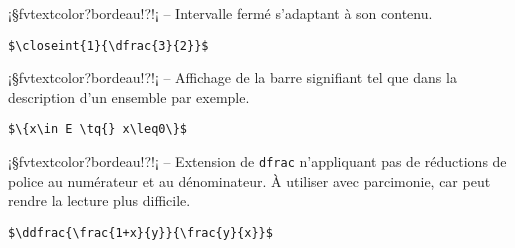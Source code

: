 \documentclass[11pt,a4paper,rgb]{report}
\begin{document}
\setlength{\leftskip}{0pt}
\setlength{\textwidth}{18cm}%


\vspace*{.75cm}

\inCodeStub¡§fvtextcolor?bordeau!?!¡ -- Intervalle fermé s'adaptant à son contenu.

\setlength{\leftskip}{.75cm}%
\setlength{\textwidth}{17.25cm}%

\colorbox{blue!15}{}
\hfill
\begin{minipage}{.65\textwidth}
	\begin{lstlisting}[linewidth=\textwidth, language={[LaTeX]TeX}]
	$\closeint{1}{\dfrac{3}{2}}$
	\end{lstlisting}
\end{minipage}

\setlength{\leftskip}{0pt}
\setlength{\textwidth}{18cm}%


\vspace*{.75cm}

\inCodeStub¡§fvtextcolor?bordeau!?\tq{}!¡ -- Affichage de la barre signifiant \og tel que\fg{} dans la description d'un ensemble par exemple.

\setlength{\leftskip}{.75cm}%
\setlength{\textwidth}{17.25cm}%

\colorbox{blue!15}{}
\hfill
\begin{minipage}{.65\textwidth}
	\begin{lstlisting}[linewidth=\textwidth, language={[LaTeX]TeX}]
	$\{x\in E \tq{} x\leq0\}$
	\end{lstlisting}
\end{minipage}

\setlength{\leftskip}{0pt}
\setlength{\textwidth}{18cm}%


\vspace*{.75cm}

\inCodeStub¡§fvtextcolor?bordeau!?!¡ -- Extension de \texttt{dfrac} n'appliquant pas de réductions de police au numérateur et au dénominateur. À utiliser avec parcimonie, car peut rendre la lecture plus difficile.

\setlength{\leftskip}{.75cm}%
\setlength{\textwidth}{17.25cm}%

\colorbox{blue!15}{}
\hfill
\begin{minipage}{.65\textwidth}
	\begin{lstlisting}[linewidth=\textwidth, language={[LaTeX]TeX}]
	$\ddfrac{\frac{1+x}{y}}{\frac{y}{x}}$
	\end{lstlisting}
\end{minipage}
\end{document}
